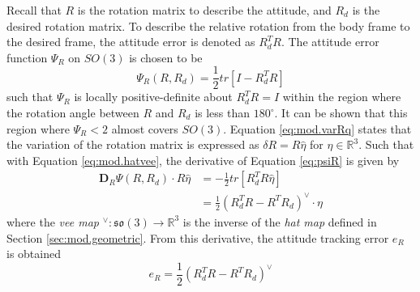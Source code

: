 Recall that $ R $ is the rotation matrix to describe the  attitude, and $ R_d $ is the desired rotation matrix. To describe the relative rotation from the body frame to the desired frame, the attitude error is denoted as $ R^T_dR $. 
The  attitude error function $ \Psi_R $ on $ SO(3) $ is chosen to be \cite{Lee2010c}
\begin{equation}\label{eq:psiR}
\Psi_R(R,R_d)=\frac{1}{2}tr\left[I-R_d^TR\right]
\end{equation}
such that $ \Psi_R $ is locally positive-definite about $ R^T_dR=I $ within the region where the rotation angle between $ R $ and $ R_d $ is less than $ 180^\circ $. 
It can be shown that this region where $ \Psi_R<2 $ almost covers $ SO(3) $.
Equation \ref{eq:mod.varRq} states that the variation of the rotation matrix is expressed as $ \delta R = R\hat{\eta} $ for $ \eta\in\mathbb{R}^3 $. Such that with Equation \ref{eq:mod.hatvee}, the derivative of Equation \ref{eq:psiR} is given by 
\begin{equation}\label{key}
\begin{aligned}
\mathbf{D}_R\Psi(R,R_d)\cdot R\hat{\eta}&=-\frac{1}{2}tr[R_d^TR\hat{\eta}]\\
&=\frac{1}{2}(R^T_dR-R^TR_d)^\vee\cdot\eta
\end{aligned}
\end{equation}
where the \textit{vee map} $ ^\vee:\mathfrak{so}(3)\rightarrow\mathbb{R}^3 $ is the inverse of the \textit{hat map} defined in Section \ref{sec:mod.geometric}. 
From this derivative, the attitude tracking error $ e_R $ is obtained 
\begin{equation}\label{eq:con.eR}
e_R=\frac{1}{2}(R_d^TR-R^TR_d)^\vee
\end{equation}
